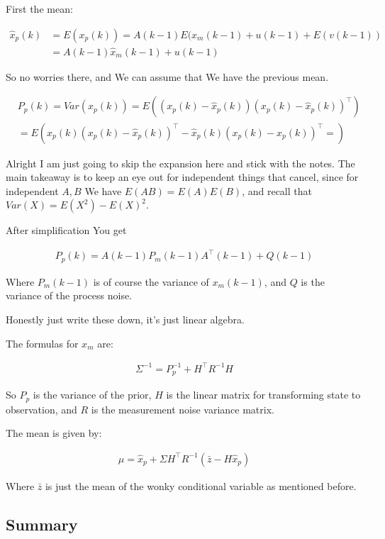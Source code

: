 \documentclass{article}
\begin{document}
		First the mean:
		
		\begin{align}
			\hat{x}_p(k) &= E(x_p(k)) = A(k-1)E(x_m(k-1) + u(k-1) + E(v(k-1))\\
			&= A(k-1) \hat{x}_m(k-1) + u(k-1)
		\end{align}
		
		So no worries there, and We can assume that We have the previous mean.
		
		\begin{align}
			&P_p(k) = Var(x_p(k)) = E((x_p(k) - \hat{x}_p(k))(x_p(k) - \hat{x}_p(k))^\top)\\
			&= E(x_p(k)(x_p(k) - \hat{x}_p(k))^\top - \hat{x}_p(k)(x_p(k) - \hat{x}_p(k))^\top=)
		\end{align}
		
		Alright I am just going to skip  the expansion here and stick with the notes. The main takeaway is to keep an eye out for independent things that cancel, since for independent $A, B$ We have $E(AB) = E(A)E(B)$, and recall that $Var(X) = E(X^2) - E(X)^2$.
		
		After simplification You get
		
		\begin{align}
			P_p(k) = A(k-1) P_m(k-1) A^\top(k-1) + Q(k-1)
		\end{align}
		
		Where $P_m(k-1)$ is of course the variance of $x_m(k-1)$, and $Q$ is the variance of the process noise.
		
		Honestly just write these down, it's just linear algebra.
		
		The formulas for $x_m$ are:
		
		\begin{align}
			\Sigma^{-1} = P_p^{-1} + H^\top R^{-1} H
		\end{align}
		
		So $P_p$ is the variance of the prior, $H$ is the linear matrix for transforming state to observation, and $R$ is the measurement noise variance matrix.
		
		The mean is given by:
		
		\begin{align}
			\mu = \hat{x}_p + \Sigma H^\top R^{-1}(\bar{z} - H\hat{x}_p)
		\end{align}
		
		Where $\bar{z}$ is just the mean of the wonky conditional variable as mentioned before.
		
	\subsection{Summary}
	
\end{document}
